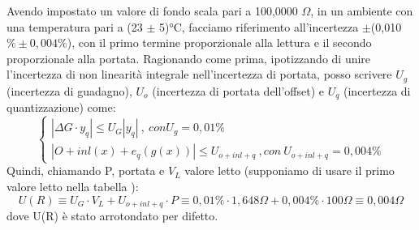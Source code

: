 Avendo impostato un valore di fondo scala pari a 100,0000 $\Omega$, in un ambiente con una temperatura pari a (23 $\pm$ 5)°C, facciamo riferimento all'incertezza $\pm$(0,010 $\% \pm 0,004 \%$), con il primo termine proporzionale alla lettura e il secondo proporzionale alla portata.
Ragionando come prima, ipotizzando di unire l'incertezza di non linearità integrale nell'incertezza di portata, posso scrivere $U_g$ (incertezza di guadagno), $U_o$ (incertezza di portata dell'offset) e $U_q$ (incertezza di quantizzazione) come: 
\begin{equation}
    \left\{ \begin{array}{rcl}
| \Delta G \cdot y_q | \leq U_G |y_q| \ , \ con U_g=0,01\%
\\ | O + inl(x) + e_q(g(x)) | \leq U_{o+inl+q} \ , con \ U_{o+inl+q}=0,004\%
\end{array}\right.
\end{equation}
Quindi, chiamando P, portata e $V_L$ valore letto (supponiamo di usare il primo valore letto nella tabella \label{mult_port}):
\begin{equation}
    U(R) \equiv U_G \cdot V_L + U_{o+inl+q} \cdot P \equiv 0,01\% \cdot 1,648\Omega + 0,004 \% \cdot 100 \Omega \equiv 0,004 \Omega 
\end{equation}
dove U(R) è stato arrotondato per difetto.
